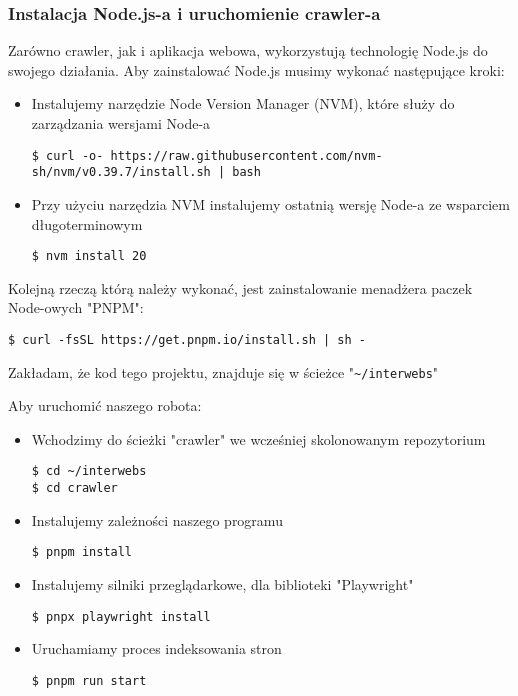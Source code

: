 \documentclass[a4paper, 12pt]{article}
\begin{document}
\subsubsection{Instalacja Node.js-a i uruchomienie crawler-a}

Zarówno crawler, jak i aplikacja webowa, wykorzystują technologię Node.js do swojego działania.
Aby zainstalować Node.js musimy wykonać następujące kroki:
\begin{itemize}
 \item Instalujemy narzędzie Node Version Manager (NVM), które służy do zarządzania wersjami Node-a
 \begin{lstlisting}
$ curl -o- https://raw.githubusercontent.com/nvm-sh/nvm/v0.39.7/install.sh | bash
 \end{lstlisting}
 \item Przy użyciu narzędzia NVM instalujemy ostatnią wersję Node-a ze wsparciem długoterminowym
 \begin{lstlisting}
$ nvm install 20
 \end{lstlisting}
\end{itemize}\cite{downloadNodeJs}

Kolejną rzeczą którą należy wykonać, jest zainstalowanie menadżera paczek Node-owych "PNPM":
\begin{lstlisting}
$ curl -fsSL https://get.pnpm.io/install.sh | sh -
\end{lstlisting}

Zakładam, że kod tego projektu, znajduje się w ścieżce "\lstinline{~/interwebs}"

Aby uruchomić naszego robota:
\begin{itemize}
 \item Wchodzimy do ścieżki "crawler" we wcześniej skolonowanym repozytorium
 \begin{lstlisting}
$ cd ~/interwebs
$ cd crawler
 \end{lstlisting}
 \item Instalujemy zależności naszego programu
 \begin{lstlisting}
$ pnpm install
 \end{lstlisting}
 \item Instalujemy silniki przeglądarkowe, dla biblioteki "Playwright"
 \begin{lstlisting}
$ pnpx playwright install
 \end{lstlisting}
 \item Uruchamiamy proces indeksowania stron
 \begin{lstlisting}
$ pnpm run start
 \end{lstlisting}
\end{itemize}
\end{document}
